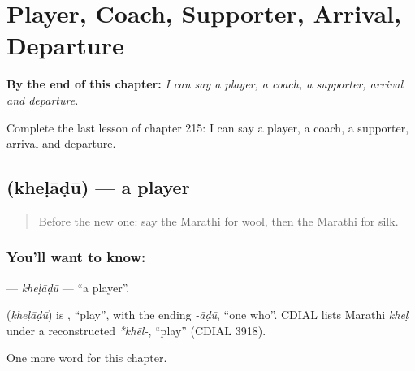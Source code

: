 
\chapter{Player, Coach, Supporter, Arrival, Departure}
\label{ch:mr-player-coach-supporter-arrival-departure}

\begin{chapteropening}
\textbf{By the end of this chapter:} \emph{I can say a player, a coach, a supporter, arrival and departure.}

Complete the last lesson of chapter 215: I can say a player, a coach, a supporter, arrival and departure.
\end{chapteropening}

\section[\texorpdfstring{\mr{खेळाडू} (kheḷāḍū)}{खेळाडू (kheḷāḍū)}]{ (kheḷāḍū) — a player}

\label{lesson:MR-C215-kheladu}



\begin{quote}
Before the new one: say the Marathi for wool, then the Marathi for silk.
\end{quote}

\subsection*{You'll want to know: }
\textbf{} — \emph{kheḷāḍū} — \textquotedblleft{}a player\textquotedblright{}.

\begin{cousinweb}
\textbf{} (\emph{kheḷāḍū}) is \textbf{}, \textquotedblleft{}play\textquotedblright{}, with the ending \emph{-āḍū}, \textquotedblleft{}one who\textquotedblright{}. CDIAL lists Marathi \emph{kheḷ} under a reconstructed \emph{*khēl-}, \textquotedblleft{}play\textquotedblright{} (CDIAL 3918).
\end{cousinweb}

\begin{grammarlens}[title={What you've built}]
One more word for this chapter.
\end{grammarlens}

